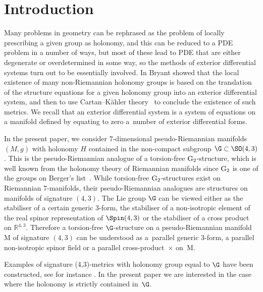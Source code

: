 \section{Introduction}

Many problems in geometry can be rephrased as the problem of locally prescribing a given group as holonomy, and this can be reduced to a PDE problem in a number of ways, but most of these lead to PDE that are either degenerate or overdetermined in some way, so the methods of exterior differential systems turn out to be essentially involved. In \cite{Bryant} Bryant showed that the local existence of many non-Riemannian holonomy groups is based on the translation of the structure equations for a given holonomy group into an exterior differential system, and then to use Cartan--K\"ahler theory~\cite{BCG} to conclude the existence of such metrics. We recall that an exterior differential system is a system of equations on a manifold defined by equating to zero a~number of exterior differential forms.

 In the present paper, we consider $7$-dimensional pseudo-Riemannian manifolds $(M, g)$ with holonomy $H$ contained in the non-compact subgroup $\G \subset \SO(4, 3)$. This is the pseudo-Riemannian analogue of a torsion-free ${\rm G}_2$-structure, which is well known from the holonomy theory of Riemannian manifolds since ${\rm G}_2$ is one of the groups on Berger's list~\cite{Berger}. While torsion-free ${\rm G}_2$-structures exist on Riemannian 7-manifolds, their pseudo-Riemannian analogues are structures on manifolds of signature $(4,3)$. The Lie group $\G$ can be viewed either as the stabiliser of a certain generic 3-form, the stabiliser of a non-isotropic element of the real spinor representation of $\Spin(4, 3)$ or the stabiliser of a cross product on ${\mathbb R}^{4,3}$. Therefore a torsion-free $\G$-structure on a pseudo-Riemannian manifold M of signature $(4, 3)$ can be understood as a~parallel generic $3$-form, a parallel non-isotropic spinor field or a parallel cross-product~$\times$ on~M.

Examples of signature (4,3)-metrics with holonomy group equal to $\G$ have been constructed, see for instance \cite{ALN, CLSS, FL, GW, LP, W2}. In the present paper we are interested in the case where the holonomy is strictly contained in~$\G$.

